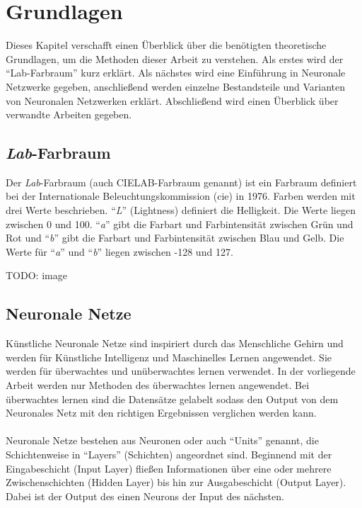 \chapter{Grundlagen}
Dieses Kapitel verschafft einen Überblick über die benötigten theoretische Grundlagen, um die Methoden dieser Arbeit zu verstehen. Als
erstes wird der ``Lab-Farbraum'' kurz erklärt. Als nächstes wird eine Einführung in Neuronale Netzwerke gegeben, anschließend werden
einzelne Bestandsteile und Varianten von Neuronalen Netzwerken erklärt. Abschließend wird einen Überblick über verwandte Arbeiten gegeben.

\section{\textit{Lab}-Farbraum} 
Der \textit{Lab}-Farbraum (auch CIELAB-Farbraum genannt) ist ein Farbraum definiert bei der Internationale
Beleuchtungskommission (\gls{cie}) in 1976. Farben werden mit drei Werte beschrieben. ``\textit{L}'' (Lightness) definiert die Helligkeit.
Die Werte liegen zwischen 0 und 100. ``\textit{a}'' gibt die Farbart und Farbintensität zwischen Grün und Rot und ``\textit{b}'' gibt die
Farbart und Farbintensität zwischen Blau und Gelb. Die Werte für ``\textit{a}'' und ``\textit{b}'' liegen zwischen -128 und 127.

TODO: image

\section{Neuronale Netze}
Künstliche Neuronale Netze sind inspiriert durch das Menschliche Gehirn und werden für Künstliche Intelligenz und Maschinelles Lernen
angewendet. Sie werden für überwachtes und unüberwachtes lernen verwendet. In der vorliegende Arbeit werden nur Methoden des überwachtes 
lernen angewendet. Bei überwachtes lernen sind die Datensätze gelabelt sodass den Output von dem Neuronales Netz mit den richtigen Ergebnissen
verglichen werden kann.
\\
\\
Neuronale Netze bestehen aus Neuronen oder auch ``Units'' genannt, die Schichtenweise in ``Layers'' (Schichten) angeordnet sind.
Beginnend mit der Eingabeschicht (Input \gls{Layer}) fließen Informationen über eine oder mehrere Zwischenschichten (Hidden \gls{Layer}) bis hin zur 
Ausgabeschicht (Output \gls{Layer}). Dabei ist der Output des einen Neurons der Input des nächsten. \cite{neuronale-netze-aufbau}

